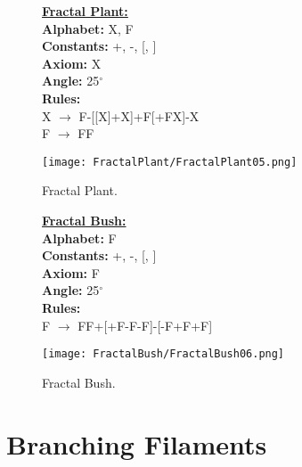 \begin{figure}[htbp]
	\raggedright
	\textbf{\underline{Fractal Plant:}} \\
	\textbf{Alphabet:} X, F\\
	\textbf{Constants:} +, -, [, ] \\
	\textbf{Axiom:} X \\
	\textbf{Angle:} 25$^\circ$ \\
	\textbf{Rules:} \\
	X $\rightarrow$ F-[[X]+X]+F[+FX]-X\\
	F $\rightarrow$ FF \\
	{\centering
		\vspace{7px}
		\texttt{[image: FractalPlant/FractalPlant05.png]}
		\caption{Fractal Plant.}
	}
\end{figure}
\begin{figure}[htbp]
	\raggedright
	\textbf{\underline{Fractal Bush:}} \\
	\textbf{Alphabet:} F\\
	\textbf{Constants:} +, -, [, ] \\
	\textbf{Axiom:} F \\
	\textbf{Angle:} 25$^\circ$ \\
	\textbf{Rules:} \\
	F $\rightarrow$ FF+[+F-F-F]-[-F+F+F]\\
	{\centering
		\vspace{7px}
		\texttt{[image: FractalBush/FractalBush06.png]}
		\caption{Fractal Bush.}
	}
\end{figure}

\FloatBarrier
\newpage
\section{Branching Filaments}